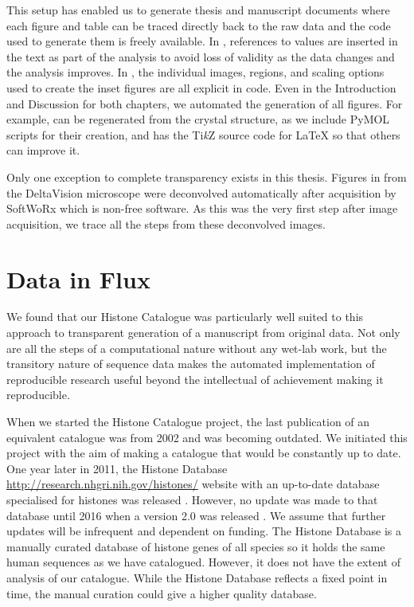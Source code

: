 This setup has enabled us to generate thesis and manuscript documents where each
figure and table can be traced directly back to the raw
data and the code used to generate them is freely
available.
In
, references to values are inserted in the
text as part of the analysis to avoid loss of validity as the data
changes and the analysis improves.  In , the
individual images, regions, and scaling options used to create the
inset figures are all explicit in code.  Even in the Introduction and
Discussion for both chapters, we
automated the generation of all figures.  For example,
 can be regenerated from the
crystal structure, as we include PyMOL
scripts for their creation, and
 has the Ti\textit{k}Z source code
for \LaTeX{} so that
others can improve it.

Only one exception to complete transparency
exists in this thesis.  Figures in
 from the DeltaVision microscope were deconvolved
automatically after
acquisition by SoftWoRx which is non-free software.
As this was the very first step
after image acquisition, we trace all the steps from these
deconvolved images.


\section{Data in Flux}

We found that our Histone Catalogue 
was particularly well suited
to this approach to transparent generation of a manuscript from
original data.  Not only are all the steps of a computational
nature without any wet-lab work, but the transitory nature of sequence data
makes the automated implementation of reproducible research useful
beyond the intellectual of achievement making it reproducible.

When we started the Histone Catalogue project, the last publication of
an equivalent catalogue
was from 2002 and was becoming outdated.  We initiated
this project with the aim of making a catalogue that would be
constantly up to date.  One year later in 2011, the Histone Database
\url{http://research.nhgri.nih.gov/histones/}
website with an up-to-date database specialised for histones
was released \citep{histonedb-2011}.
However, no update was made to that database until 2016 when a version 2.0
was released \citep{HistoneDB2016}.
We assume that further updates will
be infrequent and dependent on funding.
The Histone Database is a manually curated database of histone
genes of all species so it holds the same human sequences as we have
catalogued.
However, it does not have the extent of analysis of our catalogue.
While the Histone Database reflects a fixed point in time,
the manual curation could give a higher quality database.


